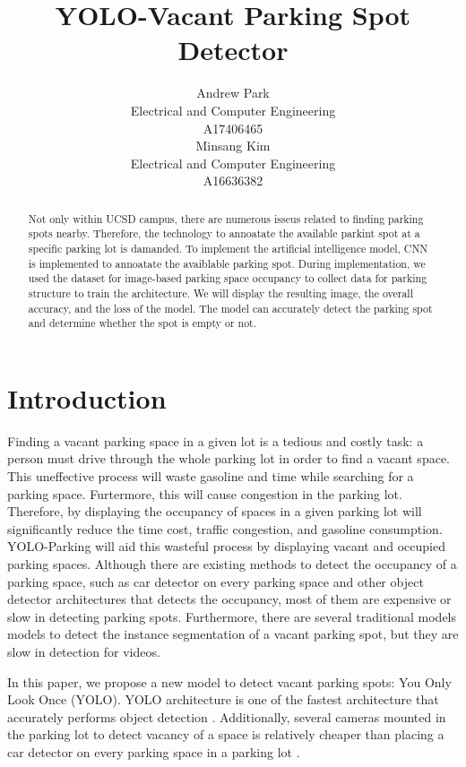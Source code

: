 \documentclass{article}
\title{YOLO-Vacant Parking Spot Detector}
\author{%
  Andrew Park \\
  Electrical and Computer Engineering\\
  A17406465\\
  \And
  Minsang Kim \\
  Electrical and Computer Engineering\\
  A16636382 \\
}
\begin{document}
\maketitle

\begin{abstract}
    Not only within UCSD campus, there are numerous isseus related to finding
    parking spots nearby. Therefore, the technology to annoatate the available parkint
    spot at a specific parking lot is damanded. To implement the artificial intelligence
    model, CNN is implemented to annoatate the avaiblable parking spot. During
    implementation, we used the dataset for image-based parking space occupancy to collect data for parking structure
    to train the architecture. We will display the resulting image, the overall accuracy,
    and the loss of the model. The model can accurately detect the parking spot and determine whether the 
    spot is empty or not. 
    

\end{abstract}

\section{Introduction}

Finding a vacant parking space in a given lot is a tedious and costly task: a person must drive through the whole parking lot in order to find a vacant space. This uneffective process will 
waste gasoline and time while searching for a parking space. Furtermore, this will cause congestion in the parking lot. Therefore, by displaying the occupancy of spaces in a given parking lot
will significantly reduce the time cost, traffic congestion, and gasoline consumption. YOLO-Parking will aid this wasteful process by displaying vacant and
occupied parking spaces. Although there are existing methods to detect the occupancy of a parking space, such as car detector on every parking space and other object detector architectures 
that detects the occupancy, most of them are expensive or slow in detecting parking spots\cite{DBLP:journals/corr/abs-2107-12207}. Furthermore, there are several traditional models  models 
to detect the instance segmentation of a vacant parking spot, but they are slow in detection for videos. 

In this paper, we propose a new model to detect vacant parking spots: You Only Look Once (YOLO). YOLO architecture is one of the fastest architecture that accurately performs object detection \cite{redmon2016look}. 
Additionally, several cameras mounted in the parking lot to detect vacancy of a space is relatively cheaper than placing a car detector on every parking space in a parking lot \cite{DBLP:journals/corr/abs-2107-12207}. 
\end{document}
